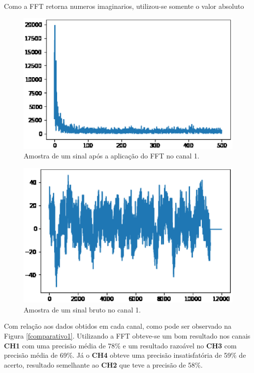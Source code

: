 Como a FFT retorna numeros imaginarios, utilizou-se somente o valor absoluto

\begin{figure}[!t]
    \centering
    \includegraphics[width=1\textwidth]{figuras/fft.eps}
    \caption{Amostra de um sinal após a aplicação do FFT no canal 1.}
    \label{fftimage}
\end{figure}

\begin{figure}[!t]
    \centering
    \includegraphics[width=1\textwidth]{figuras/sinalbruto.eps}
    \caption{Amostra de um sinal bruto no canal 1.}
    \label{sinalbruto}
\end{figure}

Com relação aos dados obtidos em cada canal, como pode ser observado na Figura \ref{fcomparativo1}. Utilizando a FFT obteve-se um bom resultado nos canais \textbf{CH1} com uma precisão média de 78\% e um resultado razoável no \textbf{CH3} com precisão média de 69\%. Já o \textbf{CH4} obteve uma precisão insatisfatória de  59\% de acerto, resultado semelhante ao \textbf{CH2} que teve a precisão de 58\%.


